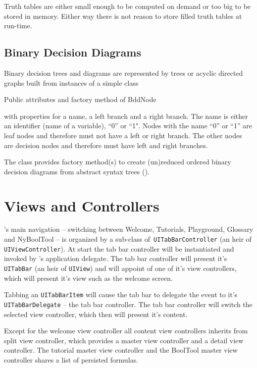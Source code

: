 Truth tables are either small enough to be computed on demand or too big to be stored in memory.
Either way there is not reason to store filled truth tables at run-time.

\subsection{Binary Decision Diagrams}

Binary decision trees and diagrams are represented by trees or acyclic directed graphs built from instances of a simple class
\begin{table}[htdp]
\begin{center}
\caption{Public attributes and factory method of BddNode}
\label{fig:BddNode}
\end{center}
\end{table}
 with properties for a name, a left branch and a right branch. The name is either an identifier (name of a variable), “0” or “1". 
Nodes with the name “0” or “1” are leaf nodes and therefore must not have a left or right branch.
The other nodes are decision nodes and therefore must have left and right branches. 

The class provides factory method(s) to create 
(un)reduced ordered binary decision diagrams from abstract syntax trees
().




\section{Views and Controllers}

\Nyaya's main navigation – switching between Welcome, Tutorials, Playground, Glossary and NyBoolTool – 
is organized by a sub-class of\verb+ UITabBarController+ (an heir of \verb+UIViewController+). 
At start the tab bar controller will be instantiated and invoked by \Nyaya's application delegate. 
The tab bar controller will present it's \verb+UITabBar+ (an heir of \verb+UIView+)
and will appoint of one of it's view controllers, which will present it's view such as the welcome screen.

Tabbing an \verb+UITabBarItem+ will cause the tab bar to delegate the event to it's \verb+UITabBarDelegate+ – the tab bar controller.
The tab bar controller will switch the selected view controller, which then will present it's content.

Except for the welcome view controller 
all content view controllers inherits from split view controller,
which provides a master view controller and a detail view controller.
The tutorial master view controller and the BoolTool master view controller shares a list of persisted formulas.

